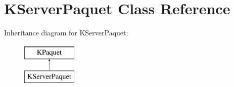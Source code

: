 \hypertarget{class_k_server_paquet}{\section{\-K\-Server\-Paquet \-Class \-Reference}
\label{class_k_server_paquet}
}
\-Inheritance diagram for \-K\-Server\-Paquet\-:\begin{figure}[H]
\begin{center}
\leavevmode
\includegraphics[height=2.000000cm]{class_k_server_paquet}
\end{center}
\end{figure}

